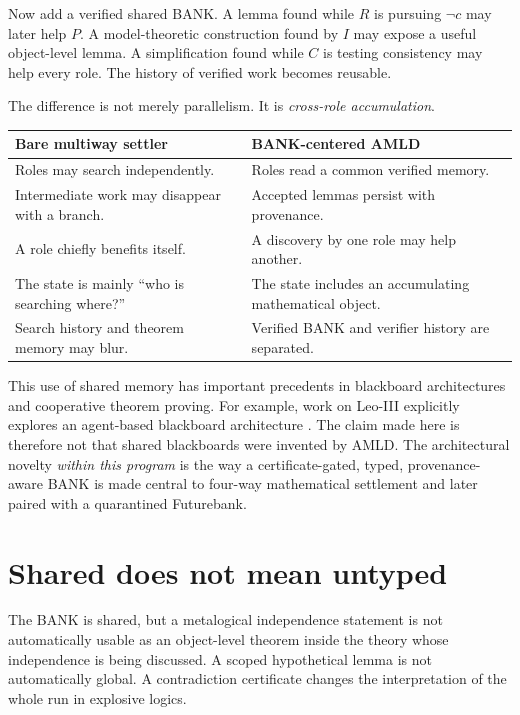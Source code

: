 \documentclass[11pt,openany]{book}
\theoremstyle{definition}
\theoremstyle{remark}
\begin{document}
Now add a verified shared BANK. A lemma found while $R$ is pursuing $\neg c$ may later help $P$. A model-theoretic construction found by $I$ may expose a useful object-level lemma. A simplification found while $C$ is testing consistency may help every role. The history of verified work becomes reusable.

The difference is not merely parallelism. It is \emph{cross-role accumulation}.

\begin{center}
\begin{tabular}{p{}p{}}
\toprule
\textbf{Bare multiway settler} & \textbf{BANK-centered AMLD}\\
\midrule
Roles may search independently. & Roles read a common verified memory.\\
Intermediate work may disappear with a branch. & Accepted lemmas persist with provenance.\\
A role chiefly benefits itself. & A discovery by one role may help another.\\
The state is mainly ``who is searching where?'' & The state includes an accumulating mathematical object.\\
Search history and theorem memory may blur. & Verified BANK and verifier history are separated.\\
\bottomrule
\end{tabular}
\end{center}

This use of shared memory has important precedents in blackboard architectures and cooperative theorem proving. For example, work on Leo-III explicitly explores an agent-based blackboard architecture \cite{Wisniewski2014}. The claim made here is therefore not that shared blackboards were invented by AMLD. The architectural novelty \emph{within this program} is the way a certificate-gated, typed, provenance-aware BANK is made central to four-way mathematical settlement and later paired with a quarantined Futurebank.

\section{Shared does not mean untyped}
The BANK is shared, but a metalogical independence statement is not automatically usable as an object-level theorem inside the theory whose independence is being discussed. A scoped hypothetical lemma is not automatically global. A contradiction certificate changes the interpretation of the whole run in explosive logics.
\end{document}
